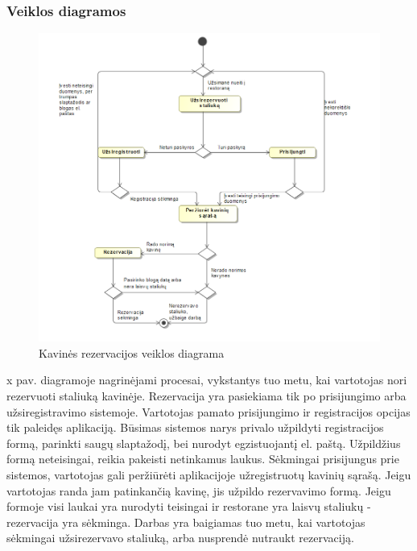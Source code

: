 \documentclass{VUMIFPSkursinis}
\begin{document}
\subsubsection{Veiklos diagramos}
\begin{figure}[H]
    \centering
    \includegraphics[width=\textwidth,height=\textheight,keepaspectratio]{img/rezerv} 
    \caption{Kavinės rezervacijos veiklos diagrama}
    \label{img:rezerv}
\end{figure}
x pav.   diagramoje nagrinėjami procesai, vykstantys tuo metu, kai vartotojas nori rezervuoti staliuką kavinėje. Rezervacija yra pasiekiama tik po prisijungimo arba užsiregistravimo sistemoje. Vartotojas pamato prisijungimo ir registracijos opcijas tik paleidęs aplikaciją. Būsimas sistemos narys privalo užpildyti registracijos formą, parinkti saugų slaptažodį, bei nurodyt egzistuojantį el. paštą. Užpildžius formą neteisingai, reikia pakeisti netinkamus laukus. Sėkmingai prisijungus prie sistemos, vartotojas gali peržiūrėti aplikacijoje užregistruotų kavinių sąrašą. Jeigu vartotojas randa jam patinkančią kavinę, jis užpildo rezervavimo formą. Jeigu formoje visi laukai yra nurodyti teisingai ir restorane yra laisvų staliukų - rezervacija yra sėkminga. Darbas yra baigiamas tuo metu, kai vartotojas sėkmingai užsirezervavo staliuką, arba nusprendė nutraukt rezervaciją.
\end{document}
